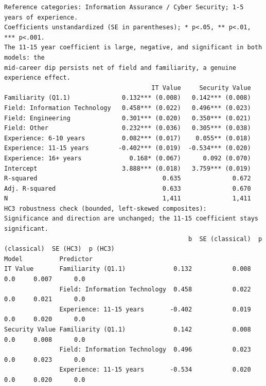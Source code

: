 {\tiny\begin{verbatim}
Reference categories: Information Assurance / Cyber Security; 1-5 years of experience.
Coefficients unstandardized (SE in parentheses); * p<.05, ** p<.01, *** p<.001.
The 11-15 year coefficient is large, negative, and significant in both models: the
mid-career dip persists net of field and familiarity, a genuine experience effect.
                                        IT Value     Security Value
Familiarity (Q1.1)              0.132*** (0.008)   0.142*** (0.008)
Field: Information Technology   0.458*** (0.022)   0.496*** (0.023)
Field: Engineering              0.301*** (0.020)   0.350*** (0.021)
Field: Other                    0.232*** (0.036)   0.305*** (0.038)
Experience: 6-10 years          0.082*** (0.017)    0.055** (0.018)
Experience: 11-15 years        -0.402*** (0.019)  -0.534*** (0.020)
Experience: 16+ years             0.168* (0.067)      0.092 (0.070)
Intercept                       3.888*** (0.018)   3.759*** (0.019)
R-squared                                  0.635              0.672
Adj. R-squared                             0.633              0.670
N                                          1,411              1,411
HC3 robustness check (bounded, left-skewed composites):
Significance and direction are unchanged; the 11-15 coefficient stays significant.
                                                  b  SE (classical)  p (classical)  SE (HC3)  p (HC3)
Model          Predictor
IT Value       Familiarity (Q1.1)             0.132           0.008            0.0     0.007      0.0
               Field: Information Technology  0.458           0.022            0.0     0.021      0.0
               Experience: 11-15 years       -0.402           0.019            0.0     0.020      0.0
Security Value Familiarity (Q1.1)             0.142           0.008            0.0     0.008      0.0
               Field: Information Technology  0.496           0.023            0.0     0.023      0.0
               Experience: 11-15 years       -0.534           0.020            0.0     0.020      0.0
\end{verbatim}}

